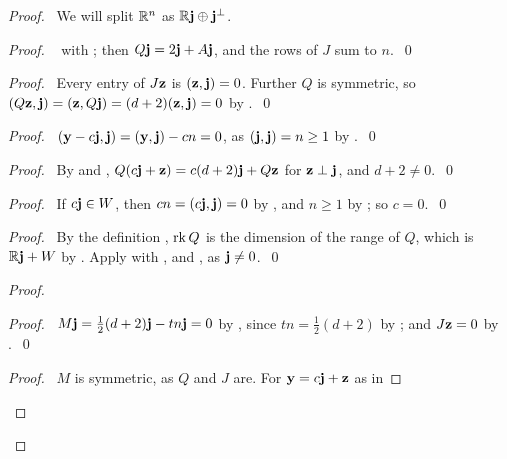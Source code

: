 \begin{proof}
 \pfsketch\ We will split ${\mathbb R}^n$ as ${\mathbb R}{\mathbf j}\oplus{\mathbf j}^\perp$.
 \begin{proof}\pf\  with ;
  then $Q{\mathbf j}=2{\mathbf j}+A{\mathbf j}$, and the rows of $J$ sum to $n$.~\qed\end{proof}
 \begin{proof}\pf\ Every entry of $J{\mathbf z}$ is $({\mathbf z},{\mathbf j})=0$. Further $Q$ is symmetric, so
  $(Q{\mathbf z},{\mathbf j})=({\mathbf z},Q{\mathbf j})=(d+2)({\mathbf z},{\mathbf j})=0$ by .~\qed\end{proof}
 \begin{proof}\pf\ $({\mathbf y}-c{\mathbf j},{\mathbf j})=({\mathbf y},{\mathbf j})-cn=0$, as $({\mathbf j},{\mathbf j})=n\ge1$ by
  .~\qed\end{proof}
 \begin{proof}\pf\ By  and , $Q(c{\mathbf j}+{\mathbf z})=c(d+2){\mathbf j}+Q{\mathbf z}$ for
  ${\mathbf z}\perp{\mathbf j}$, and $d+2\ne0$.~\qed\end{proof}
 \begin{proof}\pf\ If $c{\mathbf j}\in W$, then $cn=(c{\mathbf j},{\mathbf j})=0$ by , and $n\ge1$ by
  ; so $c=0$.~\qed\end{proof}
 \begin{proof}\pf\ By the definition , $\mathop{\mathrm{rk}}\nolimits Q$ is the dimension of the range
  of $Q$, which is ${\mathbb R}{\mathbf j}+W$ by . Apply
   with , and
  , as ${\mathbf j}\ne0$.~\qed\end{proof}
 \begin{proof}
  \begin{proof}\pf\ $M{\mathbf j}=\frac12(d+2){\mathbf j}-tn{\mathbf j}=0$ by , since
   $tn=\frac12(d+2)$ by ; and $J{\mathbf z}=0$ by .~\qed\end{proof}
  \begin{proof}\pf\ $M$ is symmetric, as $Q$ and $J$ are. For ${\mathbf y}=c{\mathbf j}+{\mathbf z}$ as in

\end{proof}
\end{proof}
\end{proof}
